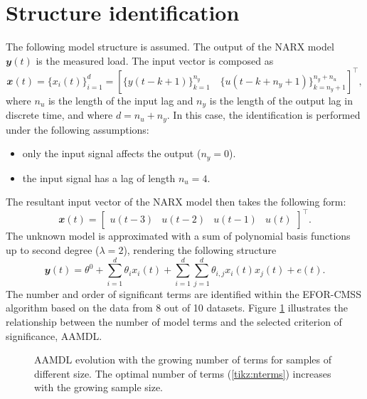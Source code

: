 \documentclass[a4paper,11pt,twoside]{article}
\theoremstyle{mytheoremstyle}
\begin{document}
\section{Structure identification}
\par The following model structure is assumed. The output of the NARX model $\mathbfit{y}(t)$ is the measured load. The input vector is composed as
\begin{equation}
	\mathbfit{x}(t) = \{x_i(t)\}^{d}_{i=1} = \left[\{y(t - k + 1)\}^{n_y}_{k=1} \quad \{u(t - k + n_y + 1)\}^{n_y + n_u}_{k= n_y + 1} \right]^{\top},
\end{equation}
where $n_u$ is the length of the input lag and $n_y$ is the length of the output lag in discrete time, and where $d = n_u + n_y$. In this case, the identification is performed under the following assumptions:
\begin{itemize}[noitemsep,topsep=0.3pt,parsep=0.3pt,partopsep=0.2pt,labelindent=1cm] 
	\item only the input signal affects the output ($n_y = 0$).
	\item the input signal has a lag of length $n_u = 4$.
\end{itemize}
The resultant input vector of the NARX model then takes the following form:
\begin{equation}
\mathbfit{x}(t) = \left[\begin{array}{cccc}
u(t-3) & u(t-2) & u(t-1) & u(t)
\end{array}\right]^{\top}.
\end{equation}
The unknown model is approximated with a sum of polynomial basis functions up to second degree ($\lambda = 2$), rendering the following structure
\begin{equation}
	\mathbfit{y}(t) = \theta^0 + \sum_{i=1}^{d} \theta_i x_i(t) + \sum_{i=1}^{d} \sum_{j=1}^{d} \theta_{i,j} x_i(t) x_j(t) + e(t).
\end{equation}
The number and order of significant terms are identified within the EFOR-CMSS algorithm based on the data from 8 out of 10 datasets. Figure \ref{fig:aamdl} illustrates the relationship between the number of model terms and the selected criterion of significance, AAMDL.
\begin{figure}[!h]
	\centering
	\caption{AAMDL evolution with the growing number of terms for samples of different size. The optimal number of terms (\ref{tikz:nterms}) increases with the growing sample size.}\label{fig:aamdl}
\end{figure}	
\end{document}
